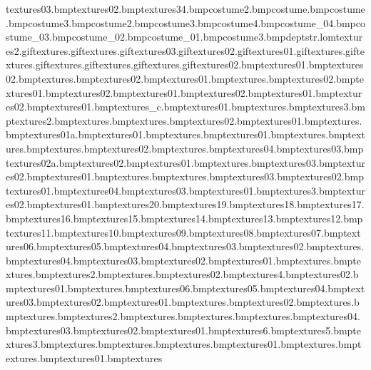 textures\gumballpost03.bmp textures\gumballs02.bmp textures\ceramictile34.bmp costume\bodyeyebrow2.bmp costume\noseshine.bmp costume\muzzlestubble.bmp costume\eyetex3.bmp costume\earslined2.bmp costume\bodytoes3.bmp costume\tongueline4.bmp costume\basketballshirt_04.bmp costume\basketballshirt_03.bmp costume\basketballshirt_02.bmp costume\basketballshirt_01.bmp costume\baseballlogo3.bmp deptstr.lom textures\tvsnow2.gif textures\tvsnow.gif textures\shoptvwowtv.gif textures\shoptvflash03.gif textures\shoptvflash02.gif textures\shoptvflash01.gif textures\shopadverts.gif textures\screenanim.gif textures\scoreboardanim.gif textures\light.gif textures\blackholemonitors.gif textures\woodblock02.bmp textures\woodblock01.bmp textures\wires02.bmp textures\wires.bmp textures\winstar02.bmp textures\winstar01.bmp textures\winsports.bmp textures\winhandle02.bmp textures\winhandle01.bmp textures\winexplan02.bmp textures\winexplan01.bmp textures\wineon02.bmp textures\wineon01.bmp textures\winblind02.bmp textures\winblind01.bmp textures\wheel_c.bmp textures\water01.bmp textures\water.bmp textures\warningsign3.bmp textures\warningsign2.bmp textures\warningsign.bmp textures\wantedlogomagenta.bmp textures\walljoiner02.bmp textures\walljoiner01.bmp textures\vpaintbed.bmp textures\voltage01a.bmp textures\voltage01.bmp textures\undersideight.bmp textures\tyre01.bmp textures\tvtop.bmp textures\tvside.bmp textures\tvshop.bmp textures\tvback02.bmp textures\tvback.bmp textures\tv04.bmp textures\tv03.bmp textures\tv02a.bmp textures\tv02.bmp textures\tv01.bmp textures\tv.bmp textures\trolleywheel03.bmp textures\trolleywheel02.bmp textures\trolleywheel01.bmp textures\trolleywheel.bmp textures\trolleytop.bmp textures\trolleymesh03.bmp textures\trolleymesh02.bmp textures\trolleymesh01.bmp textures\trolleyhandle04.bmp textures\trolleyhandle03.bmp textures\trolleyhandle01.bmp textures\treewall3.bmp textures\trash02.bmp textures\trash01.bmp textures\train20.bmp textures\train19.bmp textures\train18.bmp textures\train17.bmp textures\train16.bmp textures\train15.bmp textures\train14.bmp textures\train13.bmp textures\train12.bmp textures\train11.bmp textures\train10.bmp textures\train09.bmp textures\train08.bmp textures\train07.bmp textures\train06.bmp textures\train05.bmp textures\train04.bmp textures\train03.bmp textures\train02.bmp textures\toyyosemite.bmp textures\toywall04.bmp textures\toywall03.bmp textures\toywall02.bmp textures\toywall01.bmp textures\toytrax.bmp textures\toytarget.bmp textures\toyshopwindow2.bmp textures\toyshopwindow.bmp textures\toypopup02.bmp textures\toyconnect4.bmp textures\toycastle02.bmp textures\toycastle01.bmp textures\toybricks.bmp textures\toyblox06.bmp textures\toyblox05.bmp textures\toyblox04.bmp textures\toyblox03.bmp textures\toyblox02.bmp textures\toyblox01.bmp textures\tilltop.bmp textures\tillside02.bmp textures\tillside.bmp textures\tillseat.bmp textures\tillnormalside2.bmp textures\tillnormalside.bmp textures\tilldrawer.bmp textures\tillbuttons.bmp textures\till04.bmp textures\till03.bmp textures\till02.bmp textures\till01.bmp textures\testtex6.bmp textures\testtex5.bmp textures\testtex3.bmp textures\testtex.bmp textures\tazwanted.bmp textures\tazkite.bmp textures\tabletop01.bmp textures\tablestand.bmp textures\tableleg.bmp textures\table01.bmp textures\supermarketwind